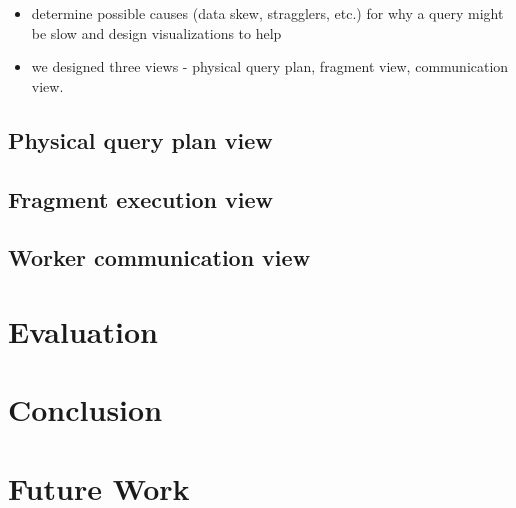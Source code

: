 \documentclass{chi2009}
\begin{document}
\begin{itemize}
    \item determine possible causes (data skew, stragglers, etc.) for why a query might be slow and design visualizations to
help 
    \item we designed three views - physical query plan, fragment view, communication view.
\end{itemize}

\subsection{Physical query plan view}
\subsection{Fragment execution view}
\subsection{Worker communication view}


\section{Evaluation}

\section{Conclusion}

\section{Future Work}



\end{document}
